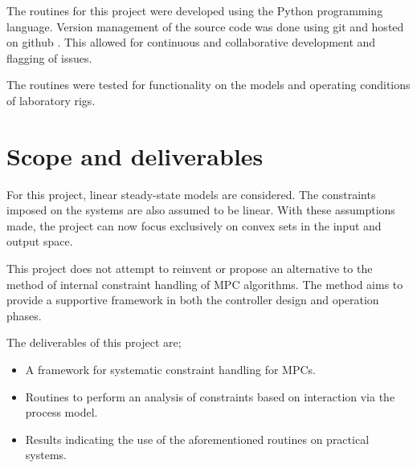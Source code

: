 The routines for this project were developed using the Python \citep{pythonref} programming language.
Version management of the source code was done using git \citep{gitref} and hosted on github \citep{githubref, githubrefcode, githubrefdiss}.
This allowed for continuous and collaborative development and flagging of issues.

The routines were tested for functionality on the models and operating conditions of laboratory rigs.

\section{Scope and deliverables}
For this project, linear steady-state models are considered.
The constraints imposed on the systems are also assumed to be linear.
With these assumptions made, the project can now focus exclusively on convex sets in the input and output space.

This project does not attempt to reinvent or propose an alternative to the method of internal constraint handling of MPC algorithms.
The method aims to provide a supportive framework in both the controller design and operation phases.

The deliverables of this project are;
\begin{itemize}
\item A framework for systematic constraint handling for MPCs.
\item Routines to perform an analysis of constraints based on interaction via the process model.
\item Results indicating the use of the aforementioned routines on practical systems.
\end{itemize}


